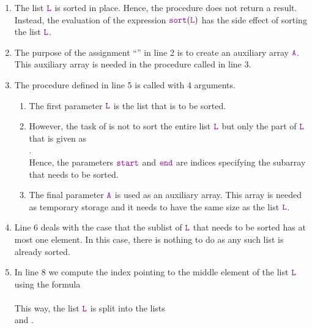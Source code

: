 \begin{enumerate}
\item The list $\mytt{L}$ is sorted in place. Hence, the procedure 
       does not return a result.  Instead, the evaluation of the expression
      $\mytt{sort}(\mytt{L})$ has the side effect of sorting the list $\mytt{L}$.
\item The purpose of the assignment ``'' in line 2 is to create an auxiliary array
      $\mytt{A}$.  This auxiliary array is needed in the procedure
       called in line 3.
\item The procedure  defined in line 5 is called with 4 arguments.
      \begin{enumerate}
      \item The first parameter $\mytt{L}$ is the list that is to be sorted.
      \item However, the task of  is not to sort the entire list $\mytt{L}$ but only
            the part of $\mytt{L}$ that is given as
            \\[0.2cm]
            \hspace*{1.3cm} 
            . 
            \\[0.2cm]
            Hence, the parameters $\mytt{start}$ and $\mytt{end}$ are indices specifying the 
            subarray that needs to be sorted.
      \item The final parameter $\mytt{A}$ is used as an auxiliary array.  This array is needed
            as temporary storage and it needs to have the same size as the list $\mytt{L}$.
      \end{enumerate} 
\item Line 6 deals with the case that the sublist of $\mytt{L}$ that needs to be sorted has at most one element.  
      In this case, there is nothing to do as any such list is already sorted.
\item In line 8 we compute the index pointing to the middle element of the list $\mytt{L}$ using the
      formula \\[0.2cm]
      \hspace*{1.3cm} 
      \\[0.2cm]
      This way, the list $\mytt{L}$ is split into the lists 
      \\[0.2cm]
      \hspace*{1.3cm}
       \quad and \quad {}.
      \\[0.2cm]

\end{enumerate}
